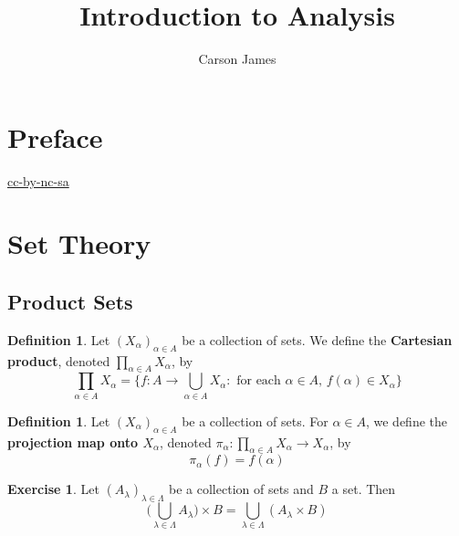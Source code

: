 \documentclass[12pt]{amsart}
\theoremstyle{definition}
\newtheorem{defn}[definition]{Definition}
\newtheorem{ex}[definition]{Exercise}
\newcommand{\al}{\alpha}
\newcommand{\lam}{\lambda}
\newcommand{\Lam}{\Lambda}
\newcommand{\tbf}[1]{\textbf{#1}}
\DeclareMathOperator*{\0}{\mbf{0}}
\DeclareMathOperator*{\1}{\mbf{1}}
\begin{document}
	
	\title{Introduction to Analysis}
	\author{Carson James}
	\maketitle
	
	\tableofcontents
	
	\section*{Preface}
	\begin{flushleft}
		\href{https://creativecommons.org/licenses/by-nc-sa/4.0/legalcode.txt}{cc-by-nc-sa}
	\end{flushleft}

	
	
	\newpage
	

	\newpage
	
	\section{Set Theory}
	\subsection{Product Sets}
	
	\begin{defn}
	Let $(X_{\al})_{\al \in A}$ be a collection of sets. We define the \tbf{Cartesian product}, denoted $\prod\limits_{\al \in A}X_{\al}$, by 
	\begin{equation*}
	\prod_{\al \in A}X_{\al} = \{f:A \rightarrow \bigcup_{\al \in A} X_{\al}: \text{ for each $\al \in A$, $f(\al) \in X_{\al}$}\}
	\end{equation*}
	\end{defn}
	
	\begin{defn}
	Let $(X_{\al})_{\al \in A}$ be a collection of sets.  For $\al \in A$, we define the \tbf{projection map onto $X_{\al}$}, denoted $\pi_{\al}:\prod\limits_{\al \in A}X_{\al} \rightarrow X_{\al}$, by 
	\begin{equation*}
	\pi_{\al}(f) = f(\al)
	\end{equation*}
	\end{defn}

	\begin{ex}
		Let $(A_{\lam})_{\lam \in \Lam}$ be a collection of sets and $B$ a set. Then 
		$$\bigg( \bigcup\limits_{\lam \in \Lam} A_{\lam} \bigg) \times B = \bigcup\limits_{\lam \in \Lam} (A_{\lam} \times B)$$
	\end{ex}
\end{document}
